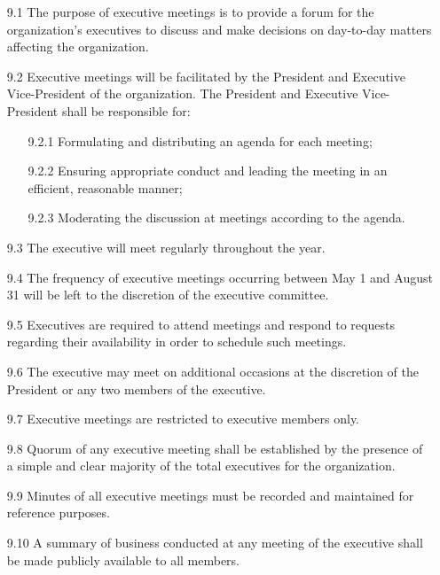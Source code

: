 \documentclass[12pt,a4paper]{article}
\begin{document}
\begin{enumerate}
\item[9.1] The purpose of executive meetings is to provide a forum for the organization's executives to discuss and make decisions on day-to-day matters affecting the organization.

\item[9.2] Executive meetings will be facilitated by the President and Executive Vice-President of the organization. The President and Executive Vice-President shall be responsible for:

\begin{enumerate}
\item[9.2.1] Formulating and distributing an agenda for each meeting;

\item[9.2.2] Ensuring appropriate conduct and leading the meeting in an efficient, reasonable manner;

\item[9.2.3] Moderating the discussion at meetings according to the agenda.
\end{enumerate}

\item[9.3] The executive will meet regularly throughout the year.

\item[9.4] The frequency of executive meetings occurring between May 1 and August 31 will be left to the discretion of the executive committee.

\item[9.5] Executives are required to attend meetings and respond to requests regarding their availability in order to schedule such meetings.

\item[9.6] The executive may meet on additional occasions at the discretion of the President or any two members of the executive.

\item[9.7] Executive meetings are restricted to executive members only.

\item[9.8] Quorum of any executive meeting shall be established by the presence of a simple and clear majority of the total executives for the organization.

\item[9.9] Minutes of all executive meetings must be recorded and maintained for reference purposes.

\item[9.10] A summary of business conducted at any meeting of the executive shall be made publicly available to all members.


\end{enumerate}
\end{document}
